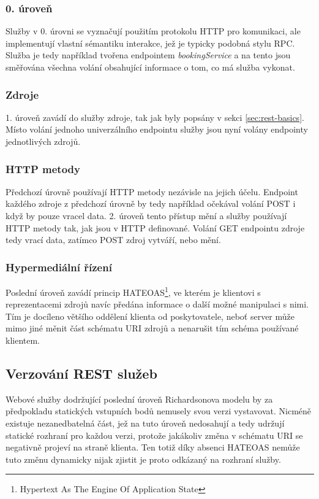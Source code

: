 \documentclass[czech,DP]{thesiskiv}
\begin{document}
\subsubsection{0. úroveň}
Služby v 0. úrovni se vyznačují použitím protokolu HTTP pro komunikaci, ale implementují vlastní sémantiku interakce, jež je typicky podobná stylu RPC. Služba je tedy například tvořena endpointem \textit{bookingService} a na tento jsou směřována všechna volání obsahující informace o tom, co má služba vykonat. 

\subsubsection{Zdroje}
1. úroveň zavádí do služby zdroje, tak jak byly popsány v sekci \ref{sec:rest-basics}. Místo volání jednoho univerzálního endpointu služby jsou nyní volány endpointy jednotlivých zdrojů.

\subsubsection{HTTP metody}
Předchozí úrovně používají HTTP metody nezávisle na jejich účelu. Endpoint každého zdroje z předchozí úrovně by tedy například očekával volání POST i když by pouze vracel data. 2. úroveň tento přístup mění a služby používají HTTP metody tak, jak jsou v HTTP definované. Volání GET endpointu zdroje tedy vrací data, zatímco POST zdroj vytváří, nebo mění. 

\subsubsection{Hypermediální řízení}
Poslední úroveň zavádí princip HATEOAS\footnote{Hypertext As The Engine Of Application State}, ve kterém je klientovi s reprezentacemi zdrojů navíc předána informace o další možné manipulaci s nimi. Tím je docíleno většího oddělení klienta od poskytovatele, neboť server může mimo jiné měnit část schématu URI zdrojů a nenarušit tím schéma používané klientem.

\subsection{Verzování REST služeb}

Webové služby dodržující poslední úroveň Richardsonova modelu by za předpokladu statických vstupních bodů nemusely svou verzi vystavovat. Nicméně existuje nezanedbatelná část, jež na tuto úroveň nedosahují a tedy udržují statické rozhraní pro každou verzi, protože jakákoliv změna v schématu URI se negativně projeví na straně klienta. Ten totiž díky absenci HATEOAS nemůže tuto změnu dynamicky nijak zjistit je proto odkázaný na rozhraní služby. 
\end{document}
